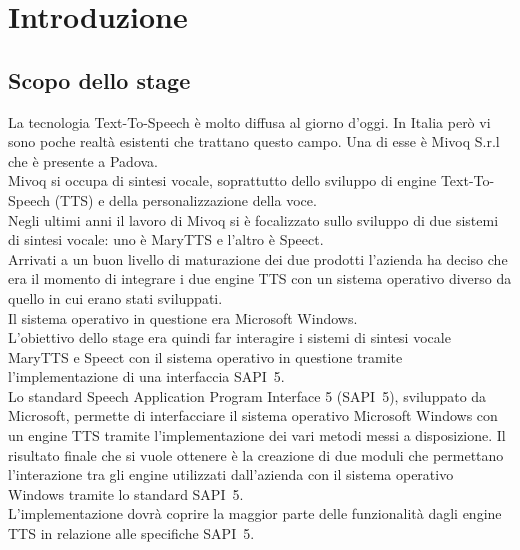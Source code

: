 \chapter{Introduzione} %
\thispagestyle{empty}
\newpage
\section{Scopo dello stage}
La tecnologia Text-To-Speech è molto diffusa al giorno d'oggi. In Italia però vi sono poche realtà esistenti che trattano questo campo. Una di esse è Mivoq S.r.l che è presente a Padova.\\
Mivoq si occupa di sintesi vocale, soprattutto dello sviluppo di engine Text-To-Speech (TTS) e della personalizzazione della voce.\\
Negli ultimi anni il lavoro di Mivoq si è focalizzato sullo sviluppo di due sistemi di sintesi vocale: uno è MaryTTS e l'altro è Speect.\\
Arrivati a un buon livello di maturazione dei due prodotti l'azienda ha deciso che era il momento di integrare i due engine TTS con un sistema operativo diverso da quello in cui erano stati sviluppati.\\
Il sistema operativo in questione era Microsoft Windows.\\
L'obiettivo dello stage era quindi far interagire i sistemi di sintesi vocale MaryTTS e Speect con il sistema operativo in questione tramite l'implementazione di una interfaccia SAPI~5.\\
Lo standard Speech Application Program Interface 5 (SAPI~5), sviluppato da Microsoft, permette di interfacciare il sistema operativo Microsoft Windows con un engine TTS tramite l'implementazione dei vari metodi messi a disposizione.
Il risultato finale che si vuole ottenere è la creazione di due moduli che permettano l'interazione tra gli engine utilizzati dall'azienda con il sistema operativo Windows tramite lo standard SAPI~5.\\
L'implementazione dovrà coprire la maggior parte delle funzionalità dagli engine TTS in relazione alle specifiche SAPI~5.


